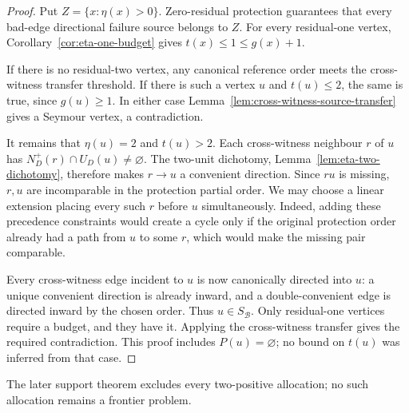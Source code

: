 \begin{proof}
Put $Z=\{x:\eta(x)>0\}$. Zero-residual protection guarantees that every
bad-edge directional failure source belongs to $Z$. For every
residual-one vertex, Corollary~\ref{cor:eta-one-budget} gives
$t(x)\le1\le g(x)+1$.

If there is no residual-two vertex, any canonical reference order
meets the cross-witness transfer threshold. If there is such a
vertex $u$ and $t(u)\le2$, the same is true, since $g(u)\ge1$.
In either case Lemma~\ref{lem:cross-witness-source-transfer} gives
a Seymour vertex, a contradiction.

It remains that $\eta(u)=2$ and $t(u)>2$. Each cross-witness neighbour
$r$ of $u$ has $N_D^+(r)\cap U_D(u)\ne\varnothing$. The two-unit
dichotomy, Lemma~\ref{lem:eta-two-dichotomy}, therefore makes $r\to u$
a convenient direction. Since $ru$ is missing, $r,u$ are incomparable
in the protection partial order. We may choose a linear extension
placing every such $r$ before $u$ simultaneously. Indeed, adding
these precedence constraints would create a cycle only if the
original protection order already had a path from $u$ to some $r$,
which would make the missing pair comparable.

Every cross-witness edge incident to $u$ is now canonically directed
into $u$: a unique convenient direction is already inward, and a
double-convenient edge is directed inward by the chosen order.
Thus $u\in S_{\mathcal B}$. Only residual-one vertices require a
budget, and they have it. Applying the cross-witness transfer gives
the required contradiction. This proof includes $P(u)=\varnothing$;
no bound on $t(u)$ was inferred from that case.
\end{proof}


The later support theorem excludes every two-positive allocation; no such allocation remains a frontier problem.
